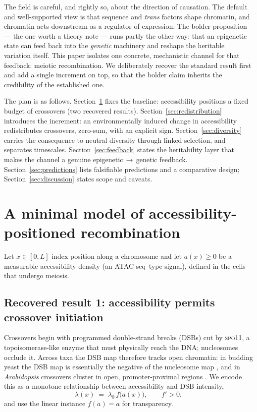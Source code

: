 \documentclass[11pt]{article}
\theoremstyle{remark}
\begin{document}
The field is careful, and rightly so, about the direction of causation. The
default and well-supported view is that sequence and \emph{trans} factors shape
chromatin, and chromatin acts downstream as a regulator of expression. The bolder
proposition --- the one worth a theory note --- runs partly the other way: that an
epigenetic state can feed back into the \emph{genetic} machinery and reshape the
heritable variation itself. This paper isolates one concrete, mechanistic channel
for that feedback: meiotic recombination. We deliberately recover the standard
result first and add a single increment on top, so that the bolder claim inherits
the credibility of the established one.

The plan is as follows. Section~\ref{sec:model} fixes the baseline: accessibility
positions a fixed budget of crossovers (two recovered results).
Section~\ref{sec:redistribution} introduces the increment: an environmentally
induced change in accessibility redistributes crossovers, zero-sum, with an
explicit sign. Section~\ref{sec:diversity} carries the consequence to neutral
diversity through linked selection, and separates timescales.
Section~\ref{sec:feedback} states the heritability layer that makes the channel a
genuine epigenetic$\,\to\,$genetic feedback. Section~\ref{sec:predictions} lists
falsifiable predictions and a comparative design;
Section~\ref{sec:discussion} states scope and caveats.

\section{A minimal model of accessibility-positioned recombination}
\label{sec:model}

Let $x \in [0, L]$ index position along a chromosome and let $a(x) \ge 0$ be a
measurable accessibility density (an ATAC-seq--type signal), defined in the cells
that undergo meiosis.

\subsection{Recovered result 1: accessibility permits crossover initiation}

Crossovers begin with programmed double-strand breaks (DSBs) cut by \textsc{spo11},
a topoisomerase-like enzyme that must physically reach the DNA; nucleosomes
occlude it. Across taxa the DSB map therefore tracks open chromatin: in budding
yeast the DSB map is essentially the negative of the nucleosome map
\citep{pan2011}, and in \emph{Arabidopsis} crossovers cluster in open,
promoter-proximal regions \citep{choi2013,tock2018}. We encode this as a monotone
relationship between accessibility and DSB intensity,
\begin{equation}
\lambda(x) \;=\; \lambda_0\, f\!\big(a(x)\big), \qquad f' > 0,
\label{eq:dsb}
\end{equation}
and use the linear instance $f(a)=a$ for transparency.
\end{document}
